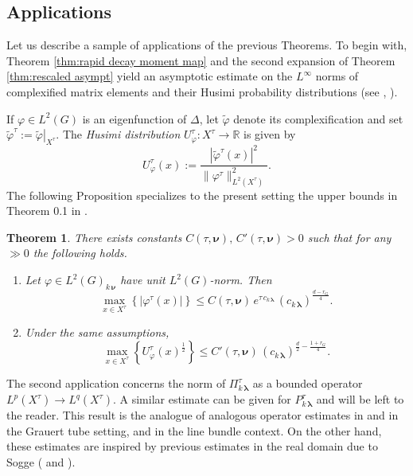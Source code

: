 \documentclass[12pt,a4paper]{article}
\theoremstyle{plain}
\newtheorem{thm}{Theorem}[section]
\theoremstyle{definition}
\begin{document}
\subsection{Applications}

Let us describe a sample of applications of the previous Theorems.
To begin with, Theorem \ref{thm:rapid decay moment map} and the
second expansion of Theorem 
\ref{thm:rescaled asympt}
yield an asymptotic estimate on the $L^\infty$ norms of complexified
matrix elements and their Husimi probability distributions (see
\cite{z12}, \cite{z20}).

If $\varphi\in L^2(G)$ is an eigenfunction of
$\Delta$, let $\tilde{\varphi}$ denote its complexification
and set $\tilde{\varphi}^\tau:=
\left.\tilde{\varphi}\right|_{X^\tau}$.
The \textit{Husimi distribution} 
$U^\tau_{\varphi}:X^\tau\rightarrow \mathbb{R}$ is given by
$$
U^\tau_{\varphi}(x):=\frac{\left|\tilde{\varphi}^\tau (x)\right|^2}{\|\varphi^\tau\|^2_{L^2(X^\tau)}}.
$$
The following Proposition specializes to the present setting
the upper bounds in Theorem 0.1 in \cite{z20}.


\begin{thm}
\label{thm:Husimi equiv}
There exists constants $C(\tau,\boldsymbol{\nu}),\,
C'(\tau,\boldsymbol{\nu})>0$ such that
for any $\gg 0$ the following holds.


\begin{enumerate}
\item Let $\varphi\in L^2(G)_{k\,\boldsymbol{\nu}}$ have
unit $L^2(G)$-norm.
Then
$$
\max_{x\in X^\tau}\left\{\left|\varphi^\tau(x)\right|\right\}\le 
C(\tau,\boldsymbol{\nu})\,
e^{\tau\,c_{k\,\boldsymbol{\lambda}}}\,
(c_{k\,\boldsymbol{\lambda}})
^{\frac{d-r_G}{4}}.
$$

\item Under the same assumptions,
$$
\max_{x\in X^\tau}\left\{ U^\tau_{\varphi}(x)^{\frac{1}{2}}
\right\}\le 
C'(\tau,\boldsymbol{\nu})\,
%
(c_{k\,\boldsymbol{\lambda}})
^{\frac{d}{2}-\frac{1+r_G}{4}}.
$$

\end{enumerate}

\end{thm}





The second application concerns the norm
of $\Pi^\tau_{k\,\boldsymbol{\lambda}}$ as a bounded operator
$L^p(X^\tau)\rightarrow L^q(X^\tau)$. A similar estimate
can be given for $P^\tau_{k\,\boldsymbol{\lambda}}$ and
will be left to the reader. This result is the analogue of 
analogous operator estimates in \cite{cr2} 
and \cite{gp24} in the Grauert tube setting, and \cite{sz03} in the line bundle context.
On the other hand, these estimates are inspired by previous estimates
in the real domain due to Sogge (\cite{so88} and \cite{so}).
\end{document}
